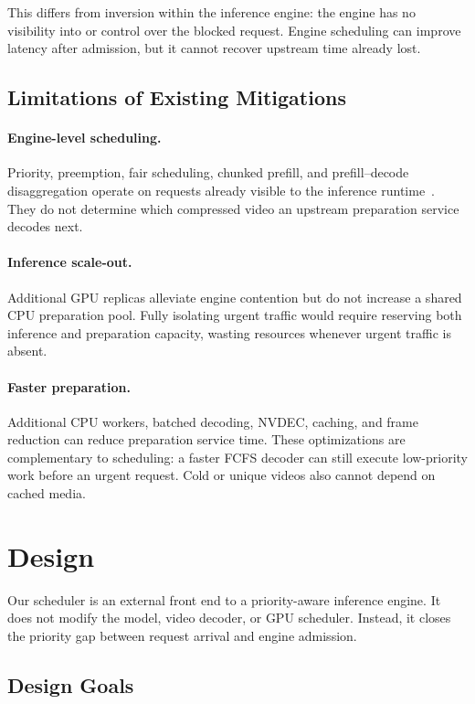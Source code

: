 \documentclass[sigconf,review,anonymous]{acmart}
\begin{document}
This differs from inversion within the inference engine: the engine has no
visibility into or control over the blocked request. Engine scheduling can
improve latency after admission, but it cannot recover upstream time already
lost.

\subsection{Limitations of Existing Mitigations}

\paragraph{Engine-level scheduling.}
Priority, preemption, fair scheduling, chunked prefill, and
prefill--decode disaggregation operate on requests already visible to the
inference runtime~\cite{fastserve,andes,sarathiserve,distserve}. They do not
determine which compressed video an upstream preparation service decodes
next.

\paragraph{Inference scale-out.}
Additional GPU replicas alleviate engine contention but do not increase a
shared CPU preparation pool. Fully isolating urgent traffic would require
reserving both inference and preparation capacity, wasting resources whenever
urgent traffic is absent.

\paragraph{Faster preparation.}
Additional CPU workers, batched decoding, NVDEC, caching, and frame reduction
can reduce preparation service time. These optimizations are complementary to
scheduling: a faster FCFS decoder can still execute low-priority work before
an urgent request. Cold or unique videos also cannot depend on cached media.

\section{Design}
\label{sec:design}

Our scheduler is an external front end to a priority-aware inference engine.
It does not modify the model, video decoder, or GPU scheduler. Instead, it
closes the priority gap between request arrival and engine admission.

\subsection{Design Goals}
\end{document}
